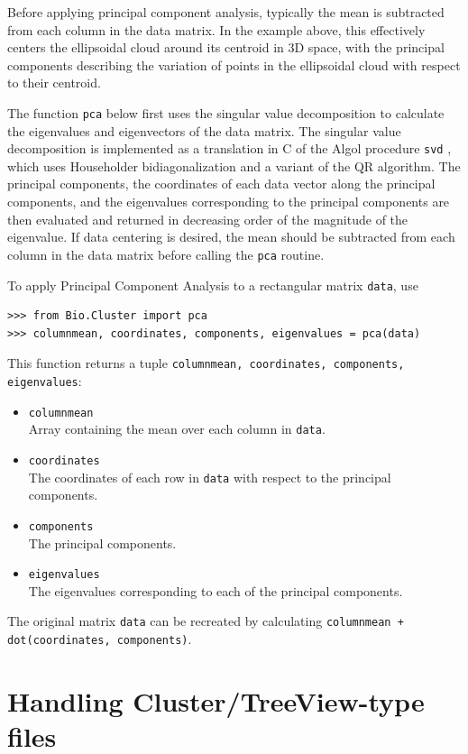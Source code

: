 \documentclass{report}
\begin{document}
Before applying principal component analysis, typically the mean is subtracted from each column in the data matrix. In the example above, this effectively centers the ellipsoidal cloud around its centroid in 3D space, with the principal components describing the variation of points in the ellipsoidal cloud with respect to their centroid.

The function \verb|pca| below first uses the singular value decomposition to calculate the eigenvalues and eigenvectors of the data matrix. The singular value decomposition is implemented as a translation in C of the Algol procedure \verb|svd| \cite{golub1971}, which uses Householder bidiagonalization and a variant of the QR algorithm. The principal components, the coordinates of each data vector along the principal components, and the eigenvalues corresponding to the principal components are then evaluated and returned in decreasing order of the magnitude of the eigenvalue. If data centering is desired, the mean should be subtracted from each column in the data matrix before calling the \verb|pca| routine.

To apply Principal Component Analysis to a rectangular matrix \verb|data|, use
\begin{verbatim}
>>> from Bio.Cluster import pca
>>> columnmean, coordinates, components, eigenvalues = pca(data)
\end{verbatim}
This function returns a tuple \verb|columnmean, coordinates, components, eigenvalues|:
\begin{itemize}
\item \verb|columnmean| \\
Array containing the mean over each column in \verb|data|.
\item \verb|coordinates| \\
The coordinates of each row in \verb|data| with respect to the principal components.
\item \verb|components| \\
The principal components.
\item \verb|eigenvalues| \\
The eigenvalues corresponding to each of the principal components.
\end{itemize}
The original matrix \verb|data| can be recreated by calculating \verb|columnmean +  dot(coordinates, components)|.

\section{Handling Cluster/TreeView-type files}
\end{document}
